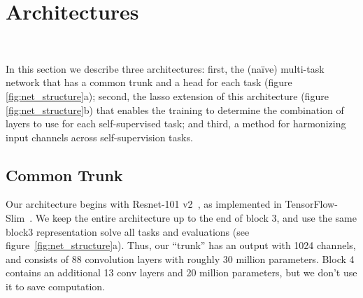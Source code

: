 \documentclass[10pt,twocolumn,letterpaper]{article}
\begin{document}
\section{Architectures}
\label{sec:architectures}

\begin{figure*}[t]
\begin{center}

   \mbox{}%
   \\
   
\end{center}

   \caption{
   The structure of our multi-task network. It is based on ResNet-101, with block 3 having 23 residual units.  a) Naive shared-trunk approach, where each ``head'' is attached to the output of block 3.  b) the lasso architecture, where each ``head'' receives a linear combination of unit outputs within block3, weighted by the matrix $\alpha$, which is trained to be sparse.
   }

\label{fig:net_structure}
\end{figure*}


In this section we describe three architectures: first, the (na{\"i}ve) multi-task network that has a common trunk and a head for each task (figure \ref{fig:net_structure}a); second, the lasso extension of this architecture (figure \ref{fig:net_structure}b) that enables the training to determine the combination of layers to use for each self-supervised task; and third, a method for harmonizing input channels across self-supervision tasks. 

\subsection{Common Trunk}

Our architecture begins with Resnet-101 v2~\cite{he2016identity}, as implemented in
TensorFlow-Slim~\cite{Guadarrama16}.  
We keep the entire architecture up to the end of block 3, and use the same block3
representation solve all tasks and
evaluations (see figure~\ref{fig:net_structure}a).  Thus, our 
``trunk'' has an output with 1024 channels, and consists of 88 convolution layers with roughly 30 million
parameters.  Block 4 contains an additional 13 conv layers and 20
million parameters, but we don't use it to save computation.
\end{document}

